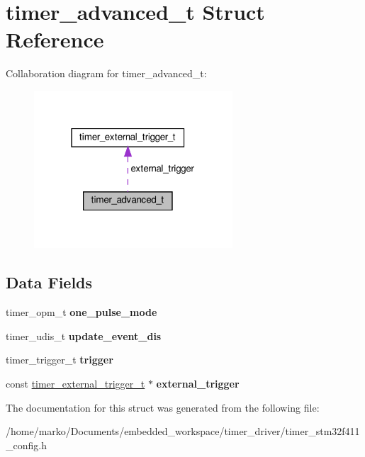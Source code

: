 \hypertarget{structtimer__advanced__t}{}\section{timer\+\_\+advanced\+\_\+t Struct Reference}
\label{structtimer__advanced__t}


Collaboration diagram for timer\+\_\+advanced\+\_\+t\+:\nopagebreak
\begin{figure}[H]
\begin{center}
\leavevmode
\includegraphics[width=210pt]{structtimer__advanced__t__coll__graph}
\end{center}
\end{figure}
\subsection*{Data Fields}
\begin{DoxyCompactItemize}
\item 
\mbox{\label{structtimer__advanced__t_af18601db6c5fffc07d7d214c606f2f00}} 
timer\+\_\+opm\+\_\+t {\bfseries one\+\_\+pulse\+\_\+mode}
\item 
\mbox{\label{structtimer__advanced__t_acebb1b98929e7dd770f19b5448ccfe95}} 
timer\+\_\+udis\+\_\+t {\bfseries update\+\_\+event\+\_\+dis}
\item 
\mbox{\label{structtimer__advanced__t_a9dc93b02cbfef454d4e6018065e03990}} 
timer\+\_\+trigger\+\_\+t {\bfseries trigger}
\item 
\mbox{\label{structtimer__advanced__t_a4c82d8472fb549c1b19979f124b4c10f}} 
const \hyperlink{structtimer__external__trigger__t}{timer\+\_\+external\+\_\+trigger\+\_\+t} $\ast$ {\bfseries external\+\_\+trigger}
\end{DoxyCompactItemize}


The documentation for this struct was generated from the following file\+:\begin{DoxyCompactItemize}
\item 
/home/marko/\+Documents/embedded\+\_\+workspace/timer\+\_\+driver/timer\+\_\+stm32f411\+\_\+config.\+h\end{DoxyCompactItemize}
